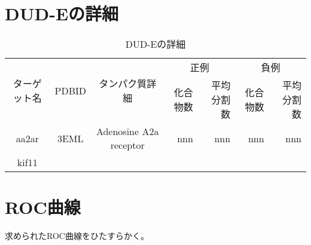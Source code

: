 \appendix
\chapter{DUD-Eの詳細}\label{appendix:dude}
\begin{table}[htb] \centering
	\caption{DUD-Eの詳細}
	\label{tb:dude_description}
	\begin{tabular}{c|c|c|rr|rr|}
	\multirow{2}{*}{ターゲット名}	&\multirow{2}{*}{PDBID}	&\multirow{2}{*}{タンパク質詳細}	&\multicolumn{2}{c|}{正例}	&\multicolumn{2}{c|}{負例}	\\
							&					&							&化合物数	&平均分割数	&化合物数	&平均分割数	\\ \hline
	aa2ar					&3EML				&Adenosine A2a receptor		&nnn		&nnn		&nnn		&nnn		\\
	kif11						&					&							&			&			&			&			\\ \hline
	\end{tabular}
\end{table}

\chapter{ROC曲線}\label{appendix:roc_curves}
求められたROC曲線をひたすらかく。